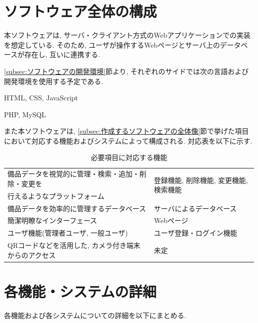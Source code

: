 \documentclass[11ptm]{jsarticle}
\begin{document}
\section{ソフトウェア全体の構成}
\label{sec:ソフトウェア全体の構成}
本ソフトウェアは, サーバ・クライアント方式のWebアプリケーションでの実装を想定している. そのため, ユーザが操作するWebページとサーバ上のデータベースが存在し, 互いに連携する. \par
\ref{subsec:ソフトウェアの開発環境}節より, それぞれのサイドでは次の言語および開発環境を使用する予定である.
\begin{description}[labelwidth=15em]
  \item[クライアントサイド(Webページ)] HTML, CSS, JavaScript
  \item[サーバサイド] PHP, MySQL
\end{description}
また本ソフトウェアは, \ref{subsec:作成するソフトウェアの全体像}節で挙げた項目において対応する機能およびシステムによって構成される. 対応表を以下に示す.
\begin{table}[h]
  \caption{必要項目に対応する機能}
  \label{tb:必要項目に対応する機能}
  \centering
  \begin{tabularx}{\linewidth}{l|l}
    備品データを視覚的に管理・検索・追加・削除・変更を   & \multirow{2}{*}{登録機能, 削除機能, 変更機能, 検索機能} \\
    行えるようなプラットフォーム                         &                                                         \\
    \hline
    備品データを効率的に管理するデータベース             & サーバによるデータベース                                \\
    \hline
    簡潔明瞭なインターフェース                           & Webページ                                               \\
    \hline
    ユーザ機能(管理者ユーザ, 一般ユーザ)                 & ユーザ登録・ログイン機能                                \\
    \hline
    QRコードなどを活用した, カメラ付き端末からのアクセス & 未定                                                    \\
  \end{tabularx}
\end{table}


\clearpage
\section{各機能・システムの詳細}
\label{sec:各機能の詳細・システムの詳細}
各機能および各システムについての詳細を以下にまとめる.
\end{document}
